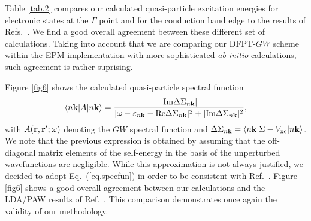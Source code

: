 \documentclass[twocolumn,prb,showpacs,superscriptaddress]{revtex4}
\def\w{\omega}
\def\E{\varepsilon}
\def\k{{\bf k}}
\def\r{{\bf r}}
\def\rp{{\bf r^\prime}}
\begin{document}
Table \ref{tab.2} compares our
calculated quasi-particle excitation energies for electronic states at the $\Gamma$ 
point and for the conduction band edge to the results of Refs.\ .
We find a good overall agreement between these different set of calculations.
Taking into account that we are comparing our DFPT-$GW$ scheme
within the EPM implementation with more sophisticated {\it ab-initio} calculations,
such agreement is rather suprising.

Figure \ref{fig6} shows the calculated quasi-particle spectral function 
  \begin{equation}\label{eq.specfun}
  \langle n\k| A|n\k\rangle = \frac{|{\rm Im} \Delta\Sigma_{n\k}|}
  {| \w-\E_{n\k} - {\rm Re}  \Delta\Sigma_{n\k} |^2 + | {\rm Im}  \Delta\Sigma_{n\k} |^2},
  \end{equation}
with $A(\r,\rp;\w)$ denoting the $GW$ spectral function and $\Delta \Sigma_{n\k} = \langle n\k| \Sigma - V_{\rm xc} |n\k\rangle$.
We note that the previous expression is obtained by assuming that the off-diagonal
matrix elements of the self-energy in the basis of the unperturbed
wavefunctions are negligible. While this approximation is not always justified,
we decided to adopt Eq.\ (\ref{eq.specfun}) in order to be consistent with Ref.\ .
Figure \ref{fig6} shows a good overall agreement between our calculations and the
LDA/PAW results of Ref.\ . This comparison demonstrates
once again the validity of our methodology.
\end{document}
